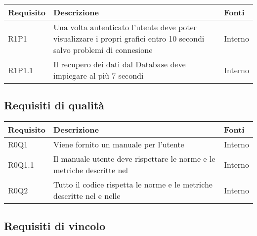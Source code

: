 \begin{center}

	\def\arraystretch{1.5}
	\bgroup
	\begin{longtable}{| p{2cm} | p{8cm} | p{2cm} |}

		\hline
		\textbf{Requisito} & \textbf{Descrizione} & \textbf{Fonti} \\
		\hline

		R1P1  &  Una volta autenticato l'utente deve poter visualizzare i propri grafici entro 10 secondi salvo problemi di connesione &  Interno \\
		\hline
		R1P1.1  &  Il recupero dei dati dal Database deve impiegare al più 7 secondi  &  Interno \\
		\hline

	\end{longtable}
	\egroup
\end{center}

\subsection{Requisiti di qualità}

\begin{center}

	\def\arraystretch{1.5}
	\bgroup
	\begin{longtable}{| p{2cm} | p{8cm} | p{2cm} |}

		\hline
		\textbf{Requisito} & \textbf{Descrizione} & \textbf{Fonti} \\
		\hline

		R0Q1  &  Viene fornito un manuale per l'utente  &  Interno \\
		\hline
		R0Q1.1  &  Il manuale utente deve rispettare le norme e le metriche descritte nel \docNameVersionPdQ  &  Interno \\
		\hline
		R0Q2  &  Tutto il codice rispetta le norme e le metriche descritte nel \docNameVersionPdQ{} e nelle \docNameVersionNdP  &  Interno \\
		\hline


	\end{longtable}
	\egroup
\end{center}

\subsection{Requisiti di vincolo}

